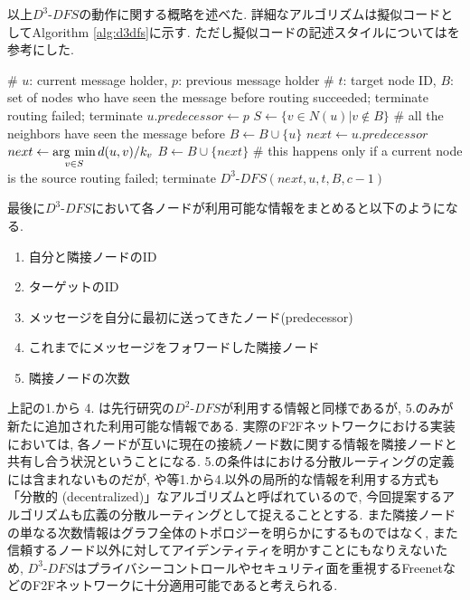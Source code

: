 \documentclass[dvipdfmx]{ampbt}
\newcommand{\argmin}{\mathop{\rm arg~min}\limits}
\begin{document}
以上$D^3$-$DFS$の動作に関する概略を述べた. 詳細なアルゴリズムは擬似コードとしてAlgorithm \ref{alg:d3dfs}に示す. ただし擬似コードの記述スタイルについては\cite{roos2013contribution}を参考にした.
   \begin{algorithm}[htbp]
    \caption{$D^3$-$DFS(\textrm{Node } u,\textrm{ Node } p, \textrm{ ID } t,\textrm{ Set }B, \textrm{ TTL }c$)}\label{alg:d3dfs}
    \begin{algorithmic}[1]
     \State \# $u$: current message holder, $p$: previous message holder
     \State \# $t$: target node ID, $B$: set of nodes who have seen the message before
     \State \textrm{routing succeeded; terminate}
     \EndIf
     \State \textrm{routing failed; terminate}
     \EndIf
     \State $u.predecessor \gets p$
     \EndIf
     \State $S \gets \{v \in N(u) |  v \notin B \}$
      \# all the neighbors have seen the message before
     \State $B \gets B \cup \{u\}$
     \State $next \gets u.predecessor$
     \Else
     \State $next \gets \argmin_{v \in S} d(u, v)/k_v$
     \State $B \gets B \cup \{ next\}$
     \EndIf
      \# this happens only if a current node is the source
     \State \textrm{routing failed; terminate}
     \Else
     \State $D^3$-$DFS(next, u, t, B, c-1)$
     \EndIf
    \end{algorithmic}
   \end{algorithm}

最後に$D^3$-$DFS$において各ノードが利用可能な情報をまとめると以下のようになる.
\begin{enumerate}
 \item 自分と隣接ノードのID
 \item ターゲットのID
 \item メッセージを自分に最初に送ってきたノード(predecessor)
 \item これまでにメッセージをフォワードした隣接ノード
 \item 隣接ノードの次数
\end{enumerate}

上記の1.から 4. は先行研究の$D^2$-$DFS$が利用する情報と同様であるが, 5.のみが新たに追加された利用可能な情報である. 実際のF2Fネットワークにおける実装においては, 各ノードが互いに現在の接続ノード数に関する情報を隣接ノードと共有し合う状況ということになる. 5.の条件は\cite{kleinberg2000small}における分散ルーティングの定義には含まれないものだが, \cite{manku2004know}や\cite{lebhar2004almost}等1.から4.以外の局所的な情報を利用する方式も「分散的 (decentralized)」なアルゴリズムと呼ばれているので, 今回提案するアルゴリズムも広義の分散ルーティングとして捉えることとする. また隣接ノードの単なる次数情報はグラフ全体のトポロジーを明らかにするものではなく, また信頼するノード以外に対してアイデンティティを明かすことにもなりえないため, $D^3$-$DFS$はプライバシーコントロールやセキュリティ面を重視するFreenetなどのF2Fネットワークに十分適用可能であると考えられる. \newline
\end{document}

